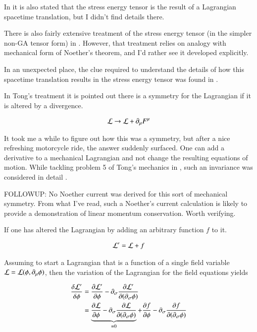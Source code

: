\documentclass{article}
\begin{document}
In \cite{srednicki2007qft} it is also stated that the stress energy tensor
is the result of a Lagrangian spacetime translation, but I didn't find
details there.

There is also fairly extensive treatment
of the stress energy tensor (in the simpler non-GA tensor form) in
\cite{jackson1975cew}.  However, that treatment relies on analogy with
mechanical form of Noether's theorem, and I'd rather see it developed
explicitly.

In an unexpected place, the 
clue required to understand the details of 
how this spacetime translation results in the stress energy tensor
was found in
\cite{TongQFT}.

In Tong's treatment it is pointed out there is a symmetry for the Lagrangian
if it is altered by a divergence.

\begin{align*}
\mathcal{L} \rightarrow \mathcal{L} + \partial_\mu F^\mu
\end{align*}

It took me a while to figure out how this was a symmetry, but after a
nice refreshing motorcycle ride, the answer suddenly surfaced.  One
can add a derivative to a mechanical Lagrangian and not change
the resulting equations of motion.  While tackling problem 5 of 
Tong's mechanics
in 
\cite{PJTongMf1}
, such an invariance was considered in
detail
.

FOLLOWUP: No Noether current was 
derived for this sort of mechanical symmetry.  From
what I've read, such a Noether's current calculation is 
likely to provide a demonstration of linear momentum conservation.  Worth
verifying.

If one has altered the Lagrangian by adding an arbitrary function $f$
to it.

\begin{align*}
\mathcal{L}' = \mathcal{L} + f
\end{align*}

Assuming to start a Lagrangian that is a function of a single field variable
$\mathcal{L} = \mathcal{L}(\phi, \partial_\mu \phi)$, then the 
variation of the Lagrangian for the field equations yields

\begin{align*}
\frac{\delta \mathcal{L}'}{\delta \phi}
&=
\frac{\partial \mathcal{L}'}{\partial \phi}
- 
\partial_\sigma \frac{\partial \mathcal{L}'}{\partial (\partial_\sigma \phi)} \\
&=
\underbrace{\frac{\partial \mathcal{L}}{\partial \phi}
- 
\partial_\sigma \frac{\partial \mathcal{L}}{\partial (\partial_\sigma \phi)} }_{=0}
+\frac{\partial f}{\partial \phi}
- 
\partial_\sigma \frac{\partial f}{\partial (\partial_\sigma \phi)} \\
\end{align*}
\end{document}
